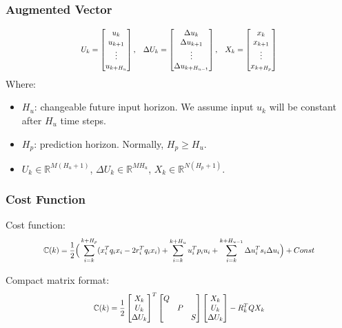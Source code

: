 \documentclass{beamer}
\newcommand\scalemath[2]{\scalebox{#1}{\mbox{\ensuremath{\displaystyle #2}}}}
\begin{document}
\begin{frame}
\frametitle{Augmented Vector}
\begin{equation}
\scalemath{0.8}{
U_k=
\begin{bmatrix}
u_k\\
u_{k+1}\\
\vdots \\
u_{k+H_u}
\end{bmatrix}
\text{,}\quad
\Delta U_k=
\begin{bmatrix}
\Delta u_k\\
\Delta u_{k+1}\\
\vdots \\
\Delta u_{k+H_{u-1}}
\end{bmatrix}
\text{,}\quad
X_k=
\begin{bmatrix}
x_k\\
x_{k+1}\\
\vdots \\
x_{k+H_p}
\end{bmatrix}\label{eq:aug}}
\end{equation}
Where:
\begin{itemize}
	\item $H_u$: changeable future input horizon. We assume input $u_k$ will be constant after $H_u$ time steps.
	\item $H_p$: prediction horizon. Normally, $H_p\geq H_u$. 
	\item $U_k \in \mathbb{R}^{M(H_{u}+1)}$, $\Delta U_k \in \mathbb{R}^{MH_{u}}$, $X_k \in \mathbb{R}^{N(H_{p}+1)}$.
\end{itemize}
\end{frame}
\begin{frame}
\frametitle{Cost Function}
Cost function:
\begin{equation}
\scalemath{0.8}{
\begin{split}
\mathbb{C}(k)=\frac{1}{2}\Big( \sum_{i=k}^{k+H_p}(x_i^Tq_ix_i-2r_i^Tq_ix_i)+\sum_{i=k}^{k+H_u}u_i^Tp_iu_i+\sum_{i=k}^{k+H_{u-1}}\Delta u_i^Ts_i\Delta u_i\Big)+Const
\label{eq:costf}
\end{split}}
\end{equation}

Compact matrix format:
\begin{equation}
\scalemath{0.8}{
\mathbb{C}(k)=\frac{1}{2}
\begin{bmatrix}
X_k\\
U_k\\
\Delta U_k
\end{bmatrix}^T
\begin{bmatrix}
Q& & \\
 &P& \\
& &S 
\end{bmatrix}
\begin{bmatrix}
X_k\\
U_k\\
\Delta U_k
\end{bmatrix}
-
R_k^TQX_k}
\end{equation}
\end{frame}
\end{document}
